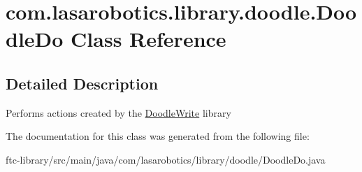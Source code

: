 \hypertarget{classcom_1_1lasarobotics_1_1library_1_1doodle_1_1_doodle_do}{}\section{com.\+lasarobotics.\+library.\+doodle.\+Doodle\+Do Class Reference}
\label{classcom_1_1lasarobotics_1_1library_1_1doodle_1_1_doodle_do}


\subsection{Detailed Description}
Performs actions created by the \hyperlink{classcom_1_1lasarobotics_1_1library_1_1doodle_1_1_doodle_write}{Doodle\+Write} library 

The documentation for this class was generated from the following file\+:\begin{DoxyCompactItemize}
\item 
ftc-\/library/src/main/java/com/lasarobotics/library/doodle/Doodle\+Do.\+java\end{DoxyCompactItemize}
